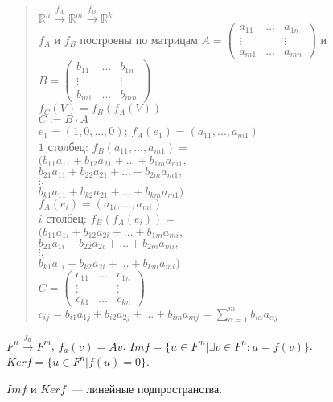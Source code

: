 \documentclass[12pt]{article}
\begin{document}
	\begin{quote}
		$\mathbb{R}^n \xrightarrow{f_A} \mathbb{R}^m \xrightarrow{f_B} \mathbb{R}^k$ \\
		$f_A$ и $f_B$ построены по матрицам $A = \left(
		\begin{smallmatrix}
			a_{11} & \dots & a_{1n} \\
			\vdots &  & \vdots \\
			a_{m1} & \dots & a_{mn}
		\end{smallmatrix}
		\right)$ и $B = \left(
		\begin{smallmatrix}
			b_{11} & \dots & b_{1n} \\
			\vdots &  & \vdots \\
			b_{m1} & \dots & b_{mn}
		\end{smallmatrix}
		\right)$ \\
		$f_C (V) = f_B (f_A (V))$ \\
		$C := B \cdot A$ \\
		$e_1 = (1, 0, \dots, 0)$; $f_A (e_1) = (a_{11}, \dots, a_{m1})$ \\
		$1$ столбец: $f_B (a_{11}, \dots, a_{m1}) =$ \\
		$(b_{11} a_{11} + b_{12} a_{21} + \dots + b_{1m}a_{m1},$ \\
		$b_{21}a_{11} + b_{22} a_{21} + \dots + b_{2m} a_{m1},$ \\
		$\vdots,$ \\
		$b_{k1} a_{11} + b_{k2} a_{21} + \dots + b_{km} a_{m1})$ \\
		$f_A (e_i) = (a_{1i}, \dots, a_{mi})$ \\
		$i$ столбец: $f_B (f_A (e_i)) =$ \\
		$(b_{11} a_{1i} + b_{12} a_{2i} + \dots + b_{1m}a_{mi},$ \\
		$b_{21}a_{1i} + b_{22} a_{2i} + \dots + b_{2m} a_{mi},$ \\
		$\vdots,$ \\
		$b_{k1} a_{1i} + b_{k2} a_{2i} + \dots + b_{km} a_{mi})$ \\
		$C = \left(
		\begin{smallmatrix}
			c_{11} & \dots & c_{1n} \\
			\vdots &  & \vdots \\
			c_{k1} & \dots & c_{kn}
		\end{smallmatrix}
		\right)$ \\
		$c_{ij} = b_{i1} a_{1j} + b_{i2} a_{2j} + \dots + b_{im} a_{mj} = \sum\limits_{\alpha = 1}^{m}b_{i \alpha} a_{\alpha j}$
	\end{quote}
	\begin{definition}
		$F^n \xrightarrow{f_a} F^m$, $f_a (v) = Av$. $Im f = \{ u \in F^m | \exists v \in F^n : u = f(v) \}$. $Ker f = \{ u \in F^n | f(u) = 0 \}$.
	\end{definition}
	\begin{statement}
		$Im f$ и $Ker f$~--- линейные подпространства.
	\end{statement}
	
\end{document}
